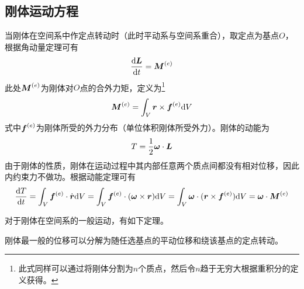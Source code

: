 \subsection{刚体运动方程}

当刚体在空间系中作定点转动时（此时平动系与空间系重合），取定点为基点$O$，根据角动量定理可有
\begin{equation*}
	\frac{\mathrm{d} \boldsymbol{L}}{\mathrm{d} t} = \boldsymbol{M}^{(e)}
\end{equation*}
此处$\boldsymbol{M}^{(e)}$为刚体对$O$点的合外力矩，定义为\footnote{此式同样可以通过将刚体分割为$n$个质点，然后令$n$趋于无穷大根据重积分的定义获得。}
\begin{equation*}
	\boldsymbol{M}^{(e)} = \int_V \boldsymbol{r} \times \boldsymbol{f}^{(e)} \mathrm{d} V
\end{equation*}
式中$\boldsymbol{f}^{(e)}$为刚体所受的外力分布（单位体积刚体所受外力）。刚体的动能为
\begin{equation*}
	T = \frac12 \boldsymbol{\omega} \cdot \boldsymbol{L}
\end{equation*}
由于刚体的性质，刚体在运动过程中其内部任意两个质点间都没有相对位移，因此内约束力不做功。根据动能定理可有
\begin{equation*}
	\frac{\mathrm{d} T}{\mathrm{d} t} = \int_V \boldsymbol{f}^{(e)} \cdot \dot{\boldsymbol{r}} \mathrm{d} V = \int_V \boldsymbol{f}^{(e)} \cdot (\boldsymbol{\omega} \times \boldsymbol{r}) \mathrm{d} V = \int_V \boldsymbol{\omega} \cdot (\boldsymbol{r} \times \boldsymbol{f}^{(e)}) \mathrm{d} V = \boldsymbol{\omega} \cdot \boldsymbol{M}^{(e)}
\end{equation*}

对于刚体在空间系的一般运动，有如下定理。

\begin{theorem}
\label{Chasles定理}
刚体最一般的位移可以分解为随任选基点的平动位移和绕该基点的定点转动。
\end{theorem}

